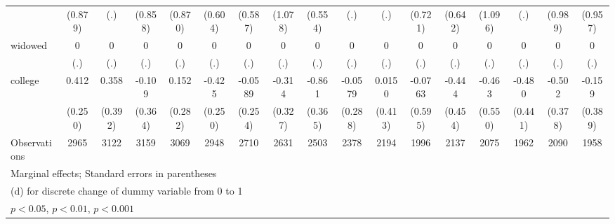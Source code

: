 {\begin{tabular}{l*{16}{c}}
                    &     (0.879)         &         (.)         &     (0.858)         &     (0.870)         &     (0.604)         &     (0.587)         &     (1.078)         &     (0.554)         &         (.)         &         (.)         &     (0.721)         &     (0.642)         &     (1.096)         &         (.)         &     (0.989)         &     (0.957)         \\
[1em]
widowed             &           0         &           0         &           0         &           0         &           0         &           0         &           0         &           0         &           0         &           0         &           0         &           0         &           0         &           0         &           0         &           0         \\
                    &         (.)         &         (.)         &         (.)         &         (.)         &         (.)         &         (.)         &         (.)         &         (.)         &         (.)         &         (.)         &         (.)         &         (.)         &         (.)         &         (.)         &         (.)         &         (.)         \\
[1em]
college             &       0.412         &       0.358         &      -0.109         &       0.152         &      -0.425         &     -0.0589         &      -0.314         &      -0.861\sym{*}  &     -0.0579         &      0.0150         &     -0.0763         &      -0.444         &      -0.463         &      -0.480         &      -0.502         &      -0.159         \\
                    &     (0.250)         &     (0.392)         &     (0.364)         &     (0.282)         &     (0.250)         &     (0.254)         &     (0.327)         &     (0.365)         &     (0.288)         &     (0.413)         &     (0.595)         &     (0.454)         &     (0.550)         &     (0.441)         &     (0.378)         &     (0.389)         \\
\hline
Observations        &        2965         &        3122         &        3159         &        3069         &        2948         &        2710         &        2631         &        2503         &        2378         &        2194         &        1996         &        2137         &        2075         &        1962         &        2090         &        1958         \\
\hline\hline
\multicolumn{17}{l}{\footnotesize Marginal effects; Standard errors in parentheses}\\
\multicolumn{17}{l}{\footnotesize  (d) for discrete change of dummy variable from 0 to 1}\\
\multicolumn{17}{l}{\footnotesize \sym{*} \(p<0.05\), \sym{**} \(p<0.01\), \sym{***} \(p<0.001\)}\\
\end{tabular}
}

